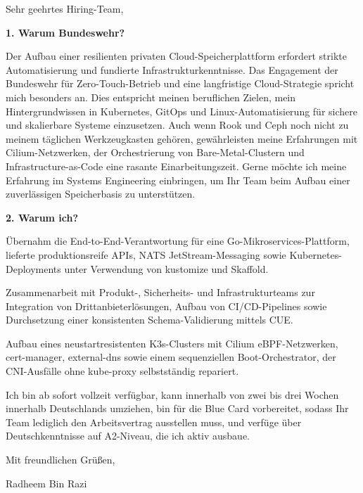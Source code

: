 \documentclass[11pt,a4paper]{coverletter}
\begin{document}

\opening{Sehr geehrtes Hiring-Team,}

\vspace{8pt}\noindent\textbf{1. Warum Bundeswehr?}\par\vspace{3pt}

Der Aufbau einer resilienten privaten Cloud-Speicherplattform erfordert strikte Automatisierung und fundierte Infrastrukturkenntnisse. Das Engagement der Bundeswehr für Zero-Touch-Betrieb und eine langfristige Cloud-Strategie spricht mich besonders an. Dies entspricht meinen beruflichen Zielen, mein Hintergrundwissen in Kubernetes, GitOps und Linux-Automatisierung für sichere und skalierbare Systeme einzusetzen. Auch wenn Rook und Ceph noch nicht zu meinem täglichen Werkzeugkasten gehören, gewährleisten meine Erfahrungen mit Cilium-Netzwerken, der Orchestrierung von Bare-Metal-Clustern und Infrastructure-as-Code eine rasante Einarbeitungszeit. Gerne möchte ich meine Erfahrung im Systems Engineering einbringen, um Ihr Team beim Aufbau einer zuverlässigen Speicherbasis zu unterstützen.

\vspace{8pt}\noindent\textbf{2. Warum ich?}\par\vspace{3pt}

\bullets

  \item Übernahm die End-to-End-Verantwortung für eine Go-Mikroservices-Plattform, lieferte produktionsreife APIs, NATS JetStream-Messaging sowie Kubernetes-Deployments unter Verwendung von kustomize und Skaffold.

  \item Zusammenarbeit mit Produkt-, Sicherheits- und Infrastrukturteams zur Integration von Drittanbieterlösungen, Aufbau von CI/CD-Pipelines sowie Durchsetzung einer konsistenten Schema-Validierung mittels CUE.

  \item Aufbau eines neustartresistenten K3s-Clusters mit Cilium eBPF-Netzwerken, cert-manager, external-dns sowie einem sequenziellen Boot-Orchestrator, der CNI-Ausfälle ohne kube-proxy selbstständig repariert.

\bulletsend

Ich bin ab sofort vollzeit verfügbar, kann innerhalb von zwei bis drei Wochen innerhalb Deutschlands umziehen, bin für die Blue Card vorbereitet, sodass Ihr Team lediglich den Arbeitsvertrag ausstellen muss, und verfüge über Deutschkenntnisse auf A2-Niveau, die ich aktiv ausbaue.

\closing{Mit freundlichen Grüßen,}{Radheem Bin Razi}
\end{document}
